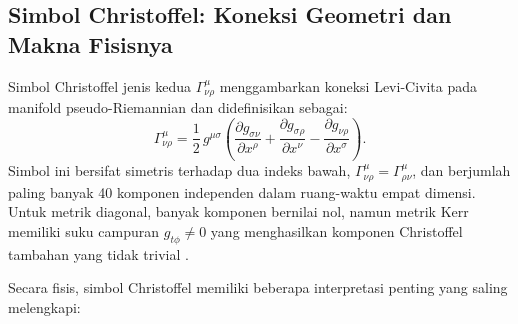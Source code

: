 \subsection{Simbol Christoffel: Koneksi Geometri dan Makna Fisisnya}
\label{subsec:christoffel-umum}

Simbol Christoffel jenis kedua $\Gamma^\mu_{\nu\rho}$ menggambarkan koneksi Levi-Civita pada manifold pseudo-Riemannian dan didefinisikan sebagai:
\begin{equation}
    \Gamma^\mu_{\nu\rho} = \frac{1}{2}\, g^{\mu\sigma}
    \left(
        \frac{\partial g_{\sigma\nu}}{\partial x^\rho}
      + \frac{\partial g_{\sigma\rho}}{\partial x^\nu}
      - \frac{\partial g_{\nu\rho}}{\partial x^\sigma}
    \right).
    \label{eq:christoffel-def}
\end{equation}
Simbol ini bersifat simetris terhadap dua indeks bawah, $\Gamma^\mu_{\nu\rho} = \Gamma^\mu_{\rho\nu}$, dan berjumlah paling banyak 40 komponen independen dalam ruang-waktu empat dimensi. Untuk metrik diagonal, banyak komponen bernilai nol, namun metrik Kerr memiliki suku campuran $g_{t\phi} \neq 0$ yang menghasilkan komponen Christoffel tambahan yang tidak trivial \parencite{Carroll2004SpacetimeGeometry}.

Secara fisis, simbol Christoffel memiliki beberapa interpretasi penting yang saling melengkapi:


